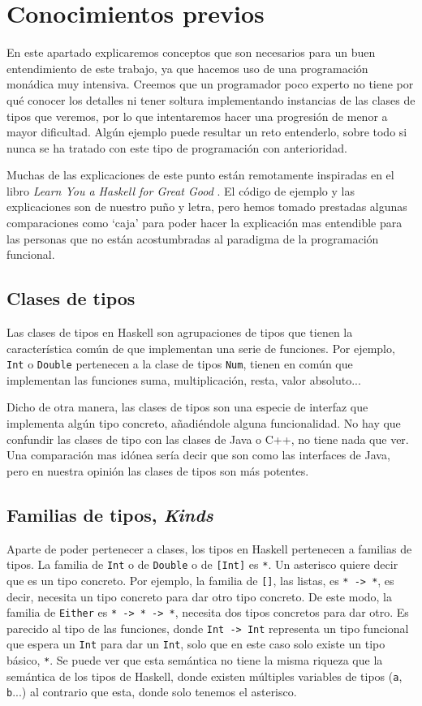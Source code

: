\documentclass[class=article, crop=false]{standalone}
\begin{document}
\section{Conocimientos previos}\label{sec:con_prev}
En este apartado explicaremos conceptos que son necesarios para un buen entendimiento de este
trabajo, ya que hacemos uso de una programación monádica muy intensiva. Creemos que un
programador poco experto no tiene por qué conocer los detalles ni tener soltura implementando
instancias de las clases de tipos que veremos, por lo que intentaremos hacer una progresión
de menor a mayor dificultad. Algún ejemplo puede resultar un reto entenderlo, sobre todo si
nunca se ha tratado con este tipo de programación con anterioridad.

Muchas de las explicaciones de este punto están remotamente inspiradas en el libro\textit{
Learn You a Haskell for Great Good} \cite{Lipovaca:2011:LYH:2018642}. El código de ejemplo y
las explicaciones son de nuestro puño y letra, pero hemos tomado prestadas algunas
comparaciones como `caja' para poder hacer la explicación mas entendible para las personas
que no están acostumbradas al paradigma de la programación funcional.

\subsection{Clases de tipos}
Las clases de tipos en Haskell son agrupaciones de tipos que tienen la característica común
de que implementan una serie de funciones. Por ejemplo, \verb`Int` o \verb`Double` pertenecen
a la clase de tipos \verb`Num`, tienen en común que implementan las funciones suma,
multiplicación, resta, valor absoluto...

Dicho de otra manera, las clases de tipos son una especie de interfaz que implementa algún
tipo concreto, añadiéndole alguna funcionalidad. No hay que confundir las clases de tipo con
las clases de Java o C++, no tiene nada que ver. Una comparación mas idónea sería decir que
son como las interfaces de Java, pero en nuestra opinión las clases de tipos son más
potentes.

\subsection{Familias de tipos, \textit{Kinds}}
Aparte de poder pertenecer a clases, los tipos en Haskell
pertenecen a familias de tipos. La familia de \verb`Int` o de \verb`Double` o de \verb`[Int]`
es \verb`*`. Un asterisco quiere decir que es un tipo concreto. Por ejemplo, la familia de
\verb`[]`, las listas, es \verb`* -> *`, es decir, necesita un tipo concreto para dar otro
tipo concreto. De este modo, la familia de \verb`Either` es \verb`* -> * -> *`, necesita dos
tipos concretos para dar otro. Es parecido al tipo de las funciones, donde \verb`Int -> Int`
representa un tipo funcional que espera un \verb`Int` para dar un \verb`Int`, solo que en
este caso solo existe un tipo básico, \verb`*`. Se puede ver que esta semántica no tiene la
misma riqueza que la semántica de los tipos de Haskell, donde existen múltiples variables de
tipos (\verb`a`, \verb`b`...) al contrario que esta, donde solo tenemos el asterisco.
\end{document}
